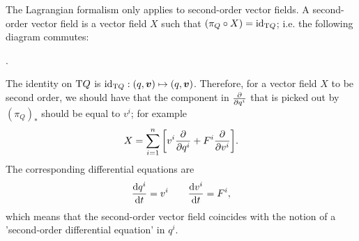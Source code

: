 The Lagrangian formalism only applies to second-order vector fields. A second-order vector field is a vector field \(X\) such that \((\pi_Q \circ X) = \mathrm{id}_{\mathrm{T}Q}\); i.e. the following diagram commutes: \cite{Abraham1978}
\begin{center}
   .
\end{center}
The identity on \(\mathrm{T}Q\) is \(\mathrm{id}_{\tbundle{Q}}: (q, \vec{v}) \mapsto (q, \vec{v})\). Therefore, for a vector field \(X\) to be second order, we should have that the component in \(\pdv{}{q^i}\) that is picked out by \((\pi_Q)_*\) should be equal to \(v^i\); for example
\begin{equation}
     X = \sum_{i=1}^n \qty[v^i \pdv{q^i} + F^i\pdv{v^i}].
\end{equation}
The corresponding differential equations are
\begin{equation}
     \dv{q^i}{t} = v^i \qquad \dv{v^i}{t} = F^i,
\end{equation}
which means that the second-order vector field coincides with the notion of a 'second-order differential equation' in \(q^i\).

